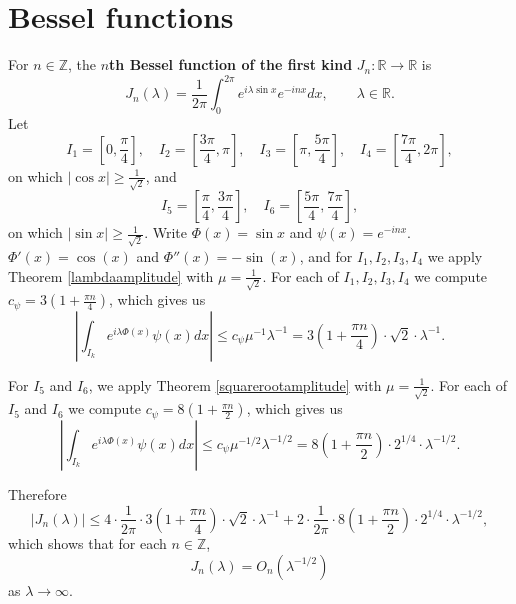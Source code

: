 \documentclass{article}
\theoremstyle{definition}
\begin{document}
\section{Bessel functions}
For $n \in \mathbb{Z}$, the \textbf{$n$th Bessel function of the first kind} $J_n:\mathbb{R} \to \mathbb{R}$ is
\[
J_n(\lambda) = \frac{1}{2\pi} \int_0^{2\pi} e^{i\lambda \sin x} e^{-inx} dx, \qquad \lambda\in \mathbb{R}.
\]
Let
\[
I_1 = \left[0,\frac{\pi}{4}\right], \quad I_2 = \left[ \frac{3\pi}{4},\pi \right], \quad  I_3 = \left[\pi,\frac{5\pi}{4}\right], \quad I_4= \left[\frac{7\pi}{4},2\pi\right],
\]
on which $|\cos x| \geq \frac{1}{\sqrt{2}}$, and
\[
I_5 = \left[\frac{\pi}{4},\frac{3\pi}{4}\right], \quad I_6=\left[\frac{5\pi}{4},\frac{7\pi}{4}\right],
\]
on which $|\sin x| \geq \frac{1}{\sqrt{2}}$. 
Write $\Phi(x)=\sin x$ and $\psi(x)=e^{-inx}$. $\Phi'(x)=\cos(x)$ and $\Phi''(x)=-\sin(x)$, 
and for $I_1,I_2,I_3,I_4$ we apply Theorem \ref{lambdaamplitude} with $\mu=\frac{1}{\sqrt{2}}$.
For each of $I_1,I_2,I_3,I_4$ we compute $c_\psi = 3\left(1+\frac{\pi n}{4}\right)$, 
which gives us
\[
\left| \int_{I_k} e^{i\lambda \Phi(x)} \psi(x) dx \right| \leq c_\psi \mu^{-1} \lambda^{-1}
=3\left(1+\frac{\pi n}{4}\right) \cdot \sqrt{2} \cdot \lambda^{-1}.
\]


For $I_5$ and $I_6$, we apply Theorem \ref{squarerootamplitude} with $\mu=\frac{1}{\sqrt{2}}$. For each of $I_5$ and $I_6$ we compute
$c_\psi = 8\left(1+\frac{\pi n}{2} \right)$, which gives us
\[
\left| \int_{I_k} e^{i\lambda \Phi(x)} \psi(x) dx \right| \leq c_\psi \mu^{-1/2} \lambda^{-1/2} = 
 8\left(1+\frac{\pi n}{2} \right) \cdot 2^{1/4} \cdot \lambda^{-1/2}.
\]

Therefore
\[
|J_n(\lambda)| \leq 4\cdot\frac{1}{2\pi} \cdot 3\left(1+\frac{\pi n}{4}\right) \cdot \sqrt{2} \cdot \lambda^{-1}
+ 2 \cdot \frac{1}{2\pi} \cdot 8\left(1+\frac{\pi n}{2} \right) \cdot 2^{1/4} \cdot \lambda^{-1/2},
\]
which shows that for each $n \in \mathbb{Z}$,
\[
J_n(\lambda) = O_n(\lambda^{-1/2})
\]
as $\lambda \to \infty$.
\end{document}
